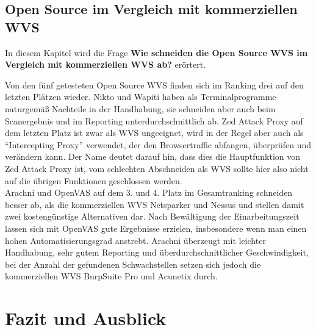 \documentclass[12pt,oneside,a4paper,parskip]{scrbook}
\begin{document}
  \section{Open Source im Vergleich mit kommerziellen WVS}
  In diesem Kapitel wird die Frage \textbf{Wie schneiden die Open Source WVS im Vergleich mit kommerziellen WVS ab?} erörtert.

  Von den fünf getesteten Open Source WVS finden sich im Ranking drei auf den letzten Plätzen wieder. Nikto und Wapiti haben als Terminalprogramme naturgemäß Nachteile in der Handhabung, sie schneiden aber auch beim Scanergebnis und im Reporting unterdurchschnittlich ab. Zed Attack Proxy auf dem letzten Platz ist zwar als WVS ungeeignet, wird in der Regel aber auch als ``Intercepting Proxy'' verwendet, der den Browsertraffic abfangen, überprüfen und verändern kann. Der Name deutet darauf hin, dass dies die Hauptfunktion von Zed Attack Proxy ist, vom schlechten Abschneiden als WVS sollte hier also nicht auf die übrigen Funktionen geschlossen werden.\\
  Arachni und OpenVAS auf dem 3. und 4. Platz im Gesamtranking schneiden besser ab, als die kommerziellen WVS Netsparker und Nessus und stellen damit zwei kostengünstige Alternativen dar. Nach Bewältigung der Einarbeitungszeit lassen sich mit OpenVAS gute Ergebnisse erzielen, insbesondere wenn man einen hohen Automatisierungsgrad anstrebt.
  Arachni überzeugt mit leichter Handhabung, sehr gutem Reporting und überdurchschnittlicher Geschwindigkeit, bei der Anzahl der gefundenen Schwachstellen setzen sich jedoch die kommerziellen WVS BurpSuite Pro und Acunetix durch.


\chapter{Fazit und Ausblick}


\end{document}
